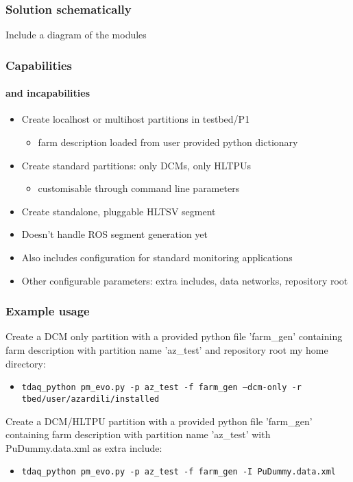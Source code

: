 \documentclass{beamer}
\begin{document}
\begin{frame}
 \frametitle{Solution schematically}
 Include a diagram of the modules
 
\end{frame}

\begin{frame}
 \frametitle{Capabilities}
 \framesubtitle{and incapabilities}
 \begin{itemize}
   \item Create localhost or multihost partitions in testbed/P1
     \begin{itemize}
       \item farm description loaded from user provided python dictionary
     \end{itemize}
   \item Create standard partitions: only DCMs, only HLTPUs
     \begin{itemize}
       \item customisable through command line parameters
     \end{itemize}

   \item Create standalone, pluggable HLTSV segment
     
   \item Doesn't handle ROS segment generation yet

   \item Also includes configuration for standard monitoring applications
     
   \item Other configurable parameters: extra includes, data networks, repository root

 \end{itemize}
 
\end{frame}


\begin{frame}
  \frametitle{Example usage}
  Create a DCM only partition with a provided python file 'farm\_gen' containing farm
  description with partition name 'az\_test' and repository root my home directory:
  \begin{itemize}
    \item \texttt{tdaq\_python pm\_evo.py -p az\_test -f farm\_gen --dcm-only -r tbed/user/azardili/installed}

  \end{itemize}

    Create a DCM/HLTPU partition with a provided python file 'farm\_gen' containing farm
  description with partition name 'az\_test' with PuDummy.data.xml as extra include:
  \begin{itemize}
    \item \texttt{tdaq\_python pm\_evo.py -p az\_test -f farm\_gen -I PuDummy.data.xml}

  \end{itemize}
  


\end{frame}
\end{document}
